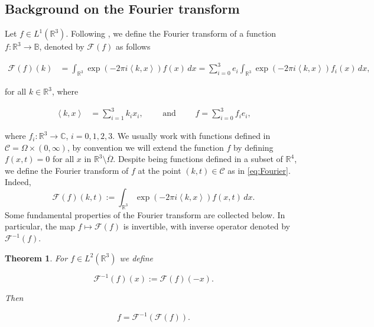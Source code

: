 \documentclass[12pt]{article}
\newtheorem{theorem}{Theorem}
\def\R{\mathbb{R}}
\def\B{\mathbb{B}}
\def\R{\mathbb{R}}
\newcommand{\inner}[1]{\left\langle #1 \right\rangle}
\newcommand{\fourier}[1]{\mathcal{F}\left( #1 \right)}
\newcommand{\fourierinv}[1]{\mathcal{F}^{-1}\left( #1 \right)}
\begin{document}
\subsection{Background on the Fourier transform}
Let $f\in L^1(\mathbb{R}^3)$. Following \cite{lieb2001analysis}, we define the Fourier transform of a function $f:\R^3\to\B$, denoted by $\fourier{f}$ as follows

\begin{align}\label{eq:Fourier}
    \fourier{f}(k)&=\int_{\R^3} \exp(-2\pi i\inner{k,x})f(x)\, dx=\sum_{i=0}^3 e_i\int_{\R^3} \exp(-2\pi i\inner{k,x})f_i(x)\, dx, 
\end{align}

for all $k\in \mathbb{R}^3$, where

\begin{align*}
    \inner{k,x}&=\sum_{i=1}^3 k_ix_i, \qquad \text{ and }\qquad f=\sum_{i=0}^3 f_ie_i,
\end{align*}

where $f_i:\R^3\to \mathbb{C}$, $i=0, 1, 2, 3.$ We usually work with functions defined in $\mathscr{C}=\Omega \times (0,\infty)$, by convention we will extend the function $f$ by defining $f(x,t)=0$ for all $x$ in $\mathbb{R}^3\setminus \overline{\Omega}$. Despite being functions defined in a subset of $\mathbb{R}^4$, we define the Fourier transform of $f$ at the point $(k,t)\in \mathscr{C}$ as in \eqref{eq:Fourier}. Indeed,
\begin{equation}\label{eq:Fourier-space-time}
    \fourier{f}(k,t):=\int_{\R^3}\exp(-2\pi i\inner{k,x})f(x,t)\,dx.
\end{equation}
Some fundamental properties of the Fourier transform are collected below. 
In particular, the map $f \mapsto \fourier{f}$ is invertible, with inverse 
operator denoted by $\fourierinv{f}$.

\begin{theorem}{\cite[Th.~5.5]{lieb2001analysis}}\label{theorem-1}
    For $f\in L^2(\R^3)$ we define 
    
    \begin{equation}\label{eq:definition-Fourier-inverse}
        \fourierinv{f}(x):=\fourier{f}(-x).
    \end{equation}
    
    Then
    
    \begin{equation}\label{eq:inversos}
        f=\fourierinv{\fourier{f}}.
    \end{equation}
\end{theorem}
\end{document}
